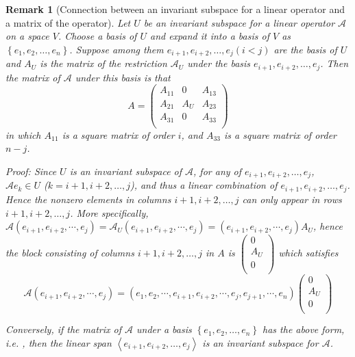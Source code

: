 \documentclass[onecolumn]{ctexart}
\newtheorem{remark}{Remark}
\begin{document}
\begin{remark}[Connection between an invariant subspace for a linear operator and a matrix of the operator]
  Let $U$ be an invariant subspace for a linear operator $\mathcal{A}$ on a 
  space $V$. Choose a basis of $U$ and expand it into a basis of $V$ as $\left\{ 
  e_1, e_2, \ldots, e_n \right\}$. Suppose among them $e_{i+1}, e_{i+2}, \ldots, 
  e_j (i < j)$ are the basis of $U$ and $A_U$ is the matrix of the restriction 
  $\mathcal{A}_U$ under the basis $e_{i+1}, e_{i+2}, \ldots, e_j$. Then the 
  matrix of $\mathcal{A}$ under this basis is that
  \[
    A = 
    \begin{pmatrix}
      A_{11} & 0 & A_{13} \\
      A_{21} & A_U & A_{23} \\
      A_{31} & 0 & A_{33} \\
    \end{pmatrix}
  \]
  in which $A_{11}$ is a square matrix of order $i$, and $A_{33}$ is a square matrix of order $n - j$.

  Proof: Since $U$ is an invariant subspace of $\mathcal{A}$, for any of $e_{i+1}, 
  e_{i+2}, \ldots, e_j$, $\mathcal{A}e_k \in U$ ($k = i+1, i+2, \ldots, j$), and 
  thus a linear combination of $e_{i+1}, e_{i+2}, \ldots, e_j$. Hence the nonzero 
  elements in columns $i+1, i+2, \ldots, j$ can only appear in rows $i+1, i+2, 
  \ldots, j$. More specifically, $\mathcal{A}(e_{i+1}, e_{i+2}, \cdots, e_j) = 
  \mathcal{A}_U(e_{i+1}, e_{i+2}, \cdots, e_j) = (e_{i+1}, e_{i+2}, \cdots, e_j)A_U$, 
  hence the block consisting of columns $i+1, i+2, \ldots, j$ in $A$ is
  $\begin{pmatrix}
    0 \\
    A_U \\
    0 \\
  \end{pmatrix}$ which satisfies
  \[
    \mathcal{A}(e_{i+1}, e_{i+2}, \cdots, e_{j}) = (e_1, e_2, \cdots, e_{i+1}, e_{i+2}, \cdots, e_j, e_{j+1}, \cdots, e_n)
    \begin{pmatrix}
      0 \\
      A_U \\
      0 \\
    \end{pmatrix}
  \]

  Conversely, if the matrix of $\mathcal{A}$ under a basis $\left\{e_1, e_2, 
  \ldots, e_n \right\}$ has the above form, i.e. , then the linear span 
  $\left\langle e_{i+1}, e_{i+2}, \ldots, e_j \right\rangle$ is an invariant 
  subspace for $\mathcal{A}$.
\end{remark}
\end{document}
